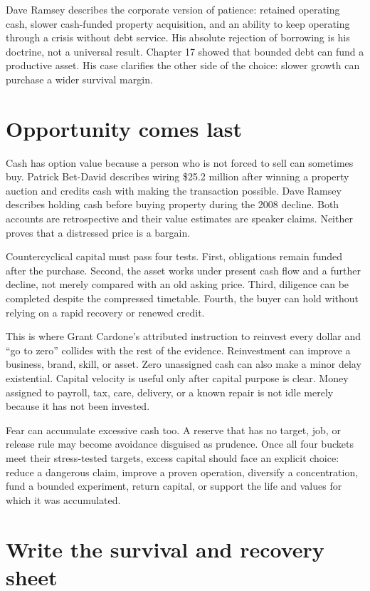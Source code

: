 Dave Ramsey describes the corporate version of patience: retained operating
cash, slower cash-funded property acquisition, and an ability to keep operating
through a crisis without debt service. His absolute rejection of borrowing is
his doctrine, not a universal result. Chapter 17 showed that bounded debt can
fund a productive asset. His case clarifies the other side of the choice:
slower growth can purchase a wider survival margin.

\section{Opportunity comes last}

Cash has option value because a person who is not forced to sell can sometimes
buy. Patrick Bet-David describes wiring \$25.2 million after winning a property
auction and credits cash with making the transaction possible. Dave Ramsey
describes holding cash before buying property during the 2008 decline. Both
accounts are retrospective and their value estimates are speaker claims.
Neither proves that a distressed price is a bargain.

Countercyclical capital must pass four tests. First, obligations remain funded
after the purchase. Second, the asset works under present cash flow and a
further decline, not merely compared with an old asking price. Third, diligence
can be completed despite the compressed timetable. Fourth, the buyer can hold
without relying on a rapid recovery or renewed credit.

This is where Grant Cardone's attributed instruction to reinvest every dollar
and “go to zero” collides with the rest of the evidence. Reinvestment can
improve a business, brand, skill, or asset. Zero unassigned cash can also make a
minor delay existential. Capital velocity is useful only after capital purpose
is clear. Money assigned to payroll, tax, care, delivery, or a known repair is
not idle merely because it has not been invested.

Fear can accumulate excessive cash too. A reserve that has no target, job, or
release rule may become avoidance disguised as prudence. Once all four buckets
meet their stress-tested targets, excess capital should face an explicit
choice: reduce a dangerous claim, improve a proven operation, diversify a
concentration, fund a bounded experiment, return capital, or support the life
and values for which it was accumulated.

\section{Write the survival and recovery sheet}


